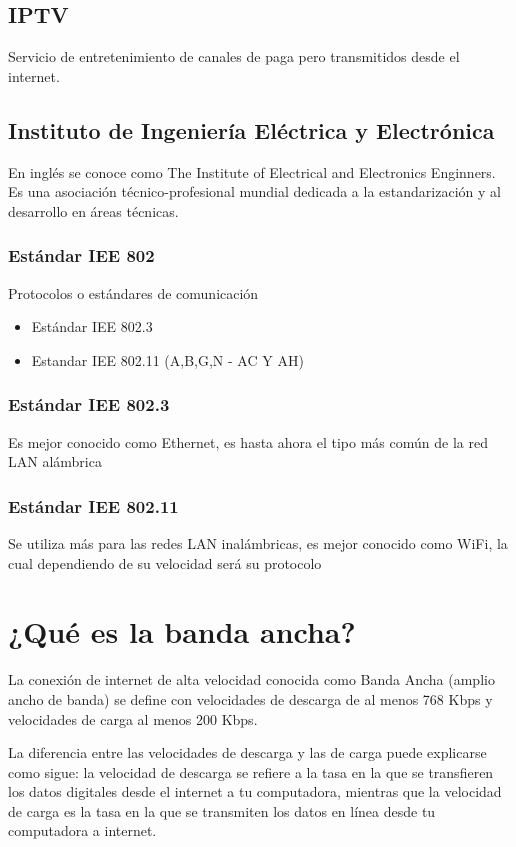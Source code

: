 \documentclass[letterpaper,12pt]{article}
\begin{document}
\begin{sloppypar}
\subsection{IPTV}
Servicio de entretenimiento de canales de paga pero transmitidos desde el internet.

\subsection{Instituto de Ingeniería Eléctrica y Electrónica}
En inglés se conoce como The Institute of Electrical and Electronics Enginners. Es una asociación técnico-profesional mundial dedicada a la estandarización y al desarrollo en áreas técnicas.

\subsubsection{Estándar IEE 802}
Protocolos o estándares de comunicación 
\begin{itemize}
    \item Estándar IEE 802.3
    \item Estandar IEE 802.11 (A,B,G,N - AC Y AH)
\end{itemize}

\subsubsection{Estándar IEE 802.3}
Es mejor conocido como Ethernet, es hasta ahora el tipo más común de la red LAN alámbrica

\subsubsection{Estándar IEE 802.11}
Se utiliza más para las redes LAN inalámbricas, es mejor conocido como WiFi, la cual dependiendo de su velocidad será su protocolo

\section{¿Qué es la banda ancha?}
La conexión de internet de alta velocidad conocida como Banda Ancha (amplio ancho de banda) se define con velocidades de descarga de al menos 768 Kbps y velocidades de carga al menos 200 Kbps. 

La diferencia entre las velocidades de descarga y las de carga puede explicarse como sigue: la velocidad de descarga se refiere a la tasa en la que se transfieren los datos digitales desde el internet a tu computadora, mientras que la velocidad de carga es la tasa en la que se transmiten los datos en línea desde tu computadora a internet.


\end{sloppypar}
\end{document}
